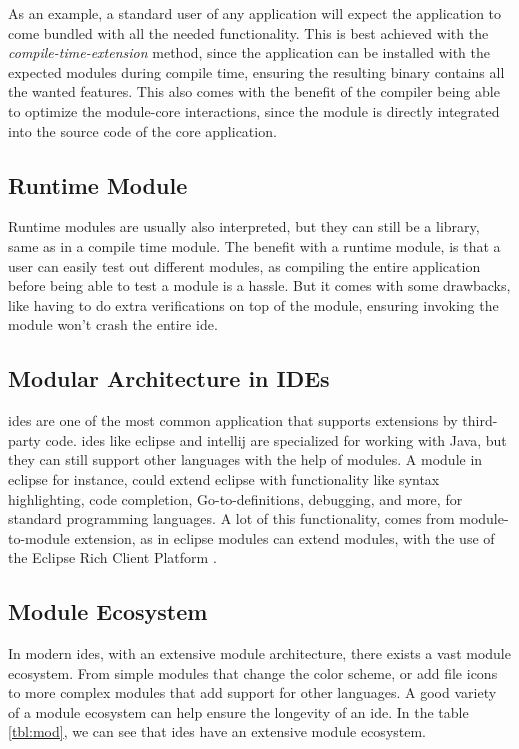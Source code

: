 As an example, a standard user of any application will expect the application to
come bundled with all the needed functionality. This is best achieved with the
\textit{compile-time-extension} method, since the application can be installed
with the expected modules during compile time, ensuring the resulting binary
contains all the wanted features. This also comes with the benefit of the
compiler being able to optimize the module-core interactions, since the module
is directly integrated into the source code of the core application.

\subsection{Runtime Module}

Runtime modules are usually also interpreted, but they can still be a
library, same as in a compile time module. The benefit with a runtime module,
is that a user can easily test out different modules, as compiling the entire
application before being able to test a module is a hassle. But it comes with
some drawbacks, like having to do extra verifications on top of the module,
ensuring invoking the module won't crash the entire \gls{ide}.

\subsection{Modular Architecture in IDEs}

\gls{ide}s are one of the most common application that supports extensions by
third-party code. \gls{ide}s like \gls{eclipse} and \gls{intellij} are
specialized for working with Java, but they can still support other languages
with the help of modules. A module in \gls{eclipse} for instance, could extend
\gls{eclipse} with functionality like syntax highlighting, code completion,
Go-to-definitions, debugging, and more, for standard programming languages.
A lot of this functionality, comes from module-to-module extension, as in
\gls{eclipse} modules can extend modules, with the use of the Eclipse Rich
Client Platform \cite{eclipseRcp}.

\subsection{Module Ecosystem}

In modern \gls{ide}s, with an extensive module architecture, there exists a
vast module ecosystem. From simple modules that change the color scheme, or
add file icons to more complex modules that add support for other languages.
A good variety of a module ecosystem can help ensure the longevity of an
\gls{ide}. In the table \ref{tbl:mod}, we can see that \gls{ide}s have an
extensive module ecosystem. \footnotemark

